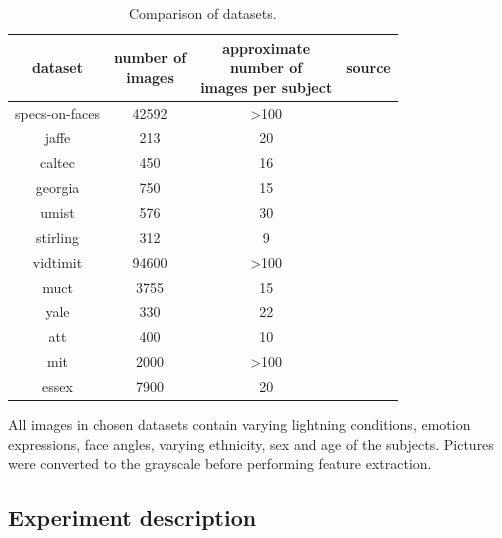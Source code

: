 \documentclass[a4paper, 10 pt, journal]{ieeeconf}
\begin{document}
\begin{table}[!h]
    \centering
    \caption{Comparison of datasets.}
    \begin{tabular}{|c|c|c|c|}
         \hline
          \rowcolor{Gray}
         dataset & \thead{number of\\ images} & \thead{approximate\\ number of\\ images per subject} & source \\
         \hline
         specs-on-faces & 42592 & >100 & \cite{afifi2017afif4} \\
         \hline
         jaffe & 213 & 20 & \cite{JAFFE} \\
         \hline
         caltec & 450 & 16 & \cite{CaltechFaces} \\
         \hline
         georgia & 750 & 15 & \cite{georgia_tech_face_database} \\
         \hline
         umist & 576 & 30 & \cite{UMist-Faces} \\
         \hline
         stirling & 312 & 9 & \cite{Stirling_faces} \\
         \hline
         vidtimit & 94600 & >100 & \cite{VidTIMIT} \\
         \hline
         muct & 3755 & 15 & \cite{Milborrow10} \\
         \hline
         yale & 330 & 22 & \cite{yale} \\
         \hline
         att & 400 & 10 & \cite{TheDatabaseOfFaces} \\
         \hline
         mit  & 2000 & >100 & \cite{FaceRecognitionDatabase} \\
         \hline
         essex & 7900 & 20 & \cite{essex} \\
          \hline
    \end{tabular}
    \label{tab:datasets}
\end{table}



All images in chosen datasets contain varying lightning conditions, emotion expressions, face angles, varying ethnicity, sex and age of the subjects. Pictures were converted to the grayscale before performing feature extraction. 

\newpage

\subsection{Experiment description}
\end{document}
